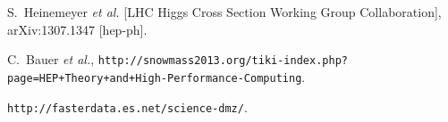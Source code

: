 \begin{thebibliography}{99}
  S.~Heinemeyer {\it et al.}  [LHC Higgs Cross Section Working Group Collaboration],
  arXiv:1307.1347 [hep-ph].

C.~Bauer {\it et al.},
{\tt http://snowmass2013.org/tiki-index.php?page=HEP+Theory+and+High-Performance-Computing}.


{\tt  http://fasterdata.es.net/science-dmz/}.

\end{thebibliography}
